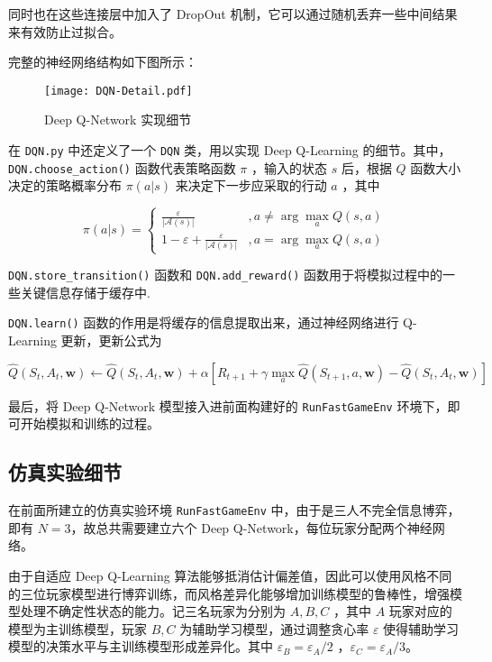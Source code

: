 同时也在这些连接层中加入了 DropOut 机制，它可以通过随机丢弃一些中间结果来有效防止过拟合\cite{srivastava2014dropout}。

完整的神经网络结构如下图所示：

\begin{figure}[H]
    \centering
    \texttt{[image: DQN-Detail.pdf]}
    \caption{Deep Q-Network 实现细节}
\end{figure}

在 \texttt{DQN.py} 中还定义了一个 \texttt{DQN} 类，用以实现 Deep Q-Learning 的细节。其中，\texttt{DQN.choose\_action()} 函数代表策略函数 $\pi$ ，输入的状态 $s$ 后，根据 $Q$ 函数大小决定的策略概率分布 $\pi(a|s)$ 来决定下一步应采取的行动 $a$ ，其中

\begin{equation}
    \pi(a|s)=
    \begin{cases}
        \frac{\varepsilon}{|\mathcal A(s)|}&, a\neq\arg\max_aQ(s,a)\\
        1-\varepsilon+\frac{\varepsilon}{|\mathcal A(s)|}&, a=\arg\max_aQ(s,a)
    \end{cases}
\end{equation}

\texttt{DQN.store\_transition()} 函数和 \texttt{DQN.add\_reward()} 函数用于将模拟过程中的一些关键信息存储于缓存中.

\texttt{DQN.learn()} 函数的作用是将缓存的信息提取出来，通过神经网络进行 Q-Learning 更新，更新公式为

\begin{equation}
    \widehat{Q}(S_t,A_t,\boldsymbol{w})\leftarrow \widehat{Q}(S_t,A_t,\boldsymbol{w})+\alpha\left[R_{t+1}+\gamma  \max\limits_a \widehat{Q}(S_{t+1},a,\boldsymbol{w})-\widehat{Q}(S_t,A_t,\boldsymbol{w})\right]
\end{equation}

最后，将 Deep Q-Network 模型接入进前面构建好的 \texttt{RunFastGameEnv} 环境下，即可开始模拟和训练的过程。

\subsection{仿真实验细节}

在前面所建立的仿真实验环境 \texttt{RunFastGameEnv} 中，由于是三人不完全信息博弈，即有 $N=3$，故总共需要建立六个 Deep Q-Network，每位玩家分配两个神经网络。

由于自适应 Deep Q-Learning 算法能够抵消估计偏差值，因此可以使用风格不同的三位玩家模型进行博弈训练，而风格差异化能够增加训练模型的鲁棒性，增强模型处理不确定性状态的能力。记三名玩家为分别为 $A,B,C$ ，其中 $A$ 玩家对应的模型为主训练模型，玩家 $B,C$ 为辅助学习模型，通过调整贪心率 $\varepsilon$ 使得辅助学习模型的决策水平与主训练模型形成差异化。其中 $\varepsilon_B = \varepsilon_A / 2$ ，$\varepsilon_C = \varepsilon_A / 3$。

